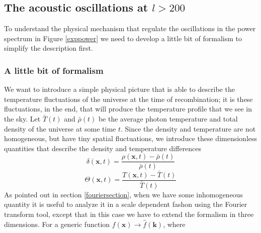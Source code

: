 \documentclass[11pt, a4paper,oneside,openright]{book}
\numberwithin{equation}{section}
\begin{document}
\subsection{The acoustic oscillations at $l>200$}
To understand the physical mechanism that regulate the oscillations in the power spectrum in Figure \ref{exppower} we need to develop a little bit of formalism to simplify the description first.
\subsubsection{A little bit of formalism}
We want to introduce a simple physical picture that is able to describe the temperature fluctuations of the universe at the time of recombination; it is these fluctuations, in the end, that will produce the temperature profile that we see in the sky. Let $\bar{T}(t)$ and $\bar{\rho}(t)$ be the average photon temperature and total density of the universe at some time $t$. Since the density and temperature are not homogeneous, but have tiny spatial fluctuations, we introduce these dimensionless quantities that describe the density and temperature differences
\begin{equation}
\delta(\mathbf{x},t)=\frac{\rho(\mathbf{x},t)-\bar{\rho}(t)}{\bar{\rho}(t)}
\end{equation}
\begin{equation}
\Theta(\mathbf{x},t)=\frac{T(\mathbf{x},t)-\bar{T}(t)}{\bar{T}(t)}
\end{equation}
As pointed out in section \ref{fouriersection}, when we have some inhomogeneous quantity it is useful to analyze it in a scale dependent fashon using the Fourier transform tool, except that in this case we have to extend the formalism in three dimensions. For a generic function $f(\mathbf{x})\rightarrow \hat{f}(\mathbf{k})$, where 
\end{document}
